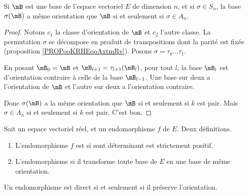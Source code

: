 \begin{corollary}
	Si \( \mB\) est une base de l'espace vectoriel \( E\) de dimension \( n\), et si \( \sigma\in S_n\), la base \( \sigma(\mB)\) a même orientation que \( \mB\) si et seulement si \( \sigma\in A_n\).
\end{corollary}

\begin{proof}
	Notons \( c_1\) la classe d'orientation de \( \mB\) et \( c_2\) l'autre classe. La permutation \( \sigma\) se décompose en produit de transpositions dont la parité est fixée (proposition \ref{PROPooKRHEooAxtmRv}). Posons \( \sigma=\tau_k\ldots \tau_1\).

	En posant \( \mB_0=\mB\) et \( \mB_{l+1}=\tau_{l+1}(\mB_l)\), pour tout \( l\), la base \( \mB_l\) est d'orientation contraire à celle de la base \( \mB_{l-1}\). Une base sur deux a l'orientation de \( \mB\) et l'autre sur deux a l'orientation contraire.

	Donc \( \sigma(\mB)\) a la même orientation que \( \mB\) si et seulement si \( k\) est pair. Mais \( \sigma\in A_n\) si et seulement si \( k\) est pair. C'est bon.
\end{proof}

\begin{propositionDef}        \label{PROPooNBAXooKNUrnk}
	Soit un espace vectoriel réel, et un endomorphisme \( f\) de \( E\). Deux définitions.
	\begin{enumerate}
		\item       \label{ITEMooOAXFooLIPHlW}
		      L'endomorphisme \( f\) est  si sont déterminant est strictement positif.
		\item       \label{ITEMooNKYCooXTgKJA}
		      L'endomorphisme  si il transforme toute base de \( E\) en une base de même orientation.
	\end{enumerate}
	Un endomorphisme est direct si et seulement si il préserve l'orientation.
\end{propositionDef}

